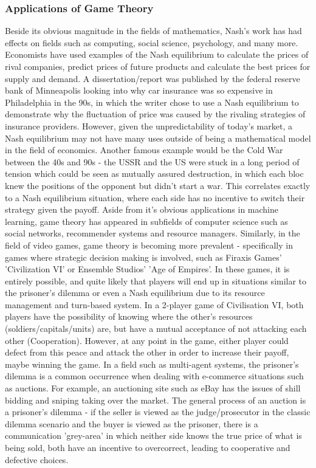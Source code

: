 \documentclass[12pt,a4paper]{article}
\begin{document}
\subsubsection{Applications of Game Theory}
Beside its obvious magnitude in the fields of mathematics, Nash's work has had effects on fields such as computing, social science, psychology, and many more. Economists have used examples of the Nash equilibrium to calculate the prices of rival companies, predict prices of future products and calculate the best prices for supply and demand. A dissertation/report was published by the federal reserve bank of Minneapolis looking into why car insurance was so expensive in Philadelphia in the 90s, in which the writer chose to use a Nash equilibrium to demonstrate why the fluctuation of price was caused by the rivaling strategies of insurance providers. However, given the unpredictability of today's market, a Nash equilibrium may not have many uses outside of being a mathematical model in the field of economics. Another famous example would be the Cold War between the 40s and 90s - the USSR and the US were stuck in a long period of tension which could be seen as mutually assured destruction, in which each bloc knew the positions of the opponent but didn't start a war. This correlates exactly to a Nash equilibrium situation, where each side has no incentive to switch their strategy given the payoff.  Aside from it's obvious applications in machine learning, game theory has appeared in subfields of computer science such as social networks, recommender systems and resource managers. Similarly, in the field of video games, game theory is becoming more prevalent - specifically in games where strategic decision making is involved, such as Firaxis Games' 'Civilization VI' or Ensemble Studios' 'Age of Empires'. In these games, it is entirely possible, and quite likely that players will end up in situations similar to the prisoner's dilemma or even a Nash equilibrium due to its resource management and turn-based system. In a 2-player game of Civilisation VI, both players have the possibility of knowing where the other's resources (soldiers/capitals/units) are, but have a mutual acceptance of not attacking each other (Cooperation). However, at any point in the game, either player could defect from this peace and attack the other in order to increase their payoff, maybe winning the game. In a field such as multi-agent systems, the prisoner's dilemma is a common occurrence when dealing with e-commerce situations such as auctions. For example, an auctioning site such as eBay has the issues of shill bidding and sniping taking over the market. The general process of an auction is a prisoner's dilemma - if the seller is viewed as the judge/prosecutor in the classic dilemma scenario and the buyer is viewed as the prisoner, there is a communication 'grey-area' in which neither side knows the true price of what is being sold, both have an incentive to overcorrect, leading to cooperative and defective choices. \\
\end{document}
